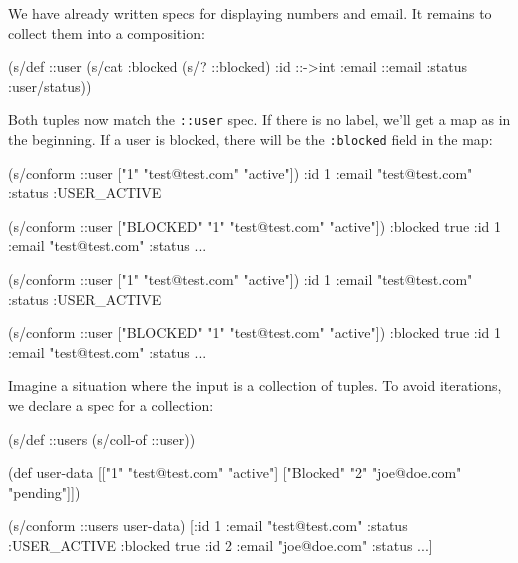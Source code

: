 We have already written specs for displaying numbers and email. It remains to collect them into a composition:

\begin{english}
  \begin{clojure}
(s/def ::user
  (s/cat :blocked (s/? ::blocked)
         :id ::->int
         :email ::email
         :status :user/status))
  \end{clojure}
\end{english}

Both tuples now match the \verb|::user| spec. If there is no label, we'll get a map as in the beginning. If a user is blocked, there will be the  \verb|:blocked| field in the map: 

\ifx\DEVICETYPE\MOBILE

\begin{english}
  \begin{clojure}
(s/conform ::user
  ["1" "test@test.com" "active"])
{:id 1
 :email "test@test.com"
 :status :USER_ACTIVE}

(s/conform ::user
  ["BLOCKED" "1"
   "test@test.com" "active"])
{:blocked true
 :id 1
 :email "test@test.com"
 :status ...}
  \end{clojure}
\end{english}

\else

\begin{english}
  \begin{clojure}
(s/conform ::user ["1" "test@test.com" "active"])
{:id 1 :email "test@test.com" :status :USER_ACTIVE}

(s/conform ::user ["BLOCKED" "1" "test@test.com" "active"])
{:blocked true :id 1 :email "test@test.com" :status ...}
  \end{clojure}
\end{english}

\fi

Imagine a situation where the input is a collection of tuples. To avoid iterations, we declare a spec for a collection:

\ifx\DEVICETYPE\MOBILE

\begin{english}
  \begin{clojure}
(s/def ::users (s/coll-of ::user))

(def user-data
  [["1" "test@test.com" "active"]
   ["Blocked" "2" "joe@doe.com"
    "pending"]])

(s/conform ::users user-data)
[{:id 1
  :email "test@test.com"
  :status :USER_ACTIVE}
 {:blocked true
  :id 2
  :email "joe@doe.com"
  :status ...}]
  \end{clojure}
\end{english}

